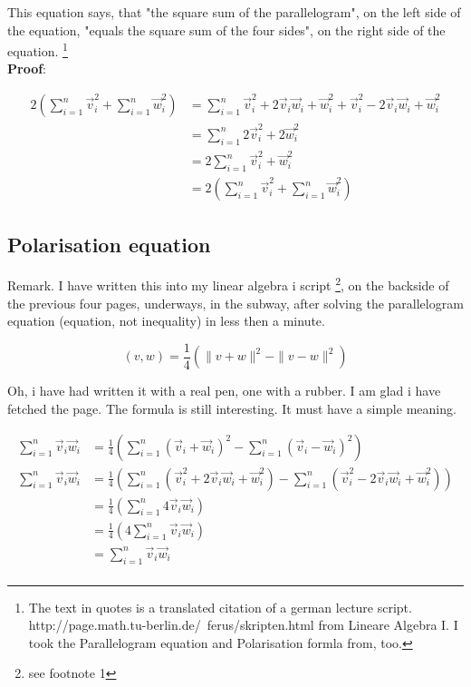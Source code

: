 \documentclass[a4paper]{article}
\begin{document}
This equation says, that "the square sum of the parallelogram", on the left side of the equation, "equals the square sum of the four sides", on the right side of the equation. \footnote{The text in quotes is a translated citation of a german lecture script. http://page.math.tu-berlin.de/~ferus/skripten.html from Lineare Algebra I. I took the Parallelogram equation and Polarisation formla from, too.}\\

\textbf{Proof}:

\begin{displaymath}
\begin{align}
2(\sum_{i=1}^{n}\vec{v}_{i}^{2} + \sum_{i=1}^{n}\vec{w}_{i}^{2}) &= \sum_{i=1}^{n}\vec{v}_{i}^{2}+2\vec{v}_{i}\vec{w}_{i}+\vec{w}_{i}^{2}+\vec{v}_{i}^{2}-2\vec{v}_{i}\vec{w}_{i}+\vec{w}_{i}^{2}\\
&= \sum_{i=1}^{n}2\vec{v}_{i}^{2}+2\vec{w}_{i}^2\\ 
&= 2\sum_{i=1}^{n}\vec{v}_{i}^{2}+\vec{w}_{i}^{2} \\
&= 2(\sum_{i=1}^{n}\vec{v}_{i}^{2} + \sum_{i=1}^{n}\vec{w}_{i}^{2})
\end{align}
\end{displaymath}

\subsection{Polarisation equation}

Remark. I have written this into my linear algebra i script \cite{FerusLA}\footnote{see footnote 1}, on the backside of the previous four pages, underways, 
in the subway, after solving the parallelogram equation (equation, not inequality) in less then a minute. 

\begin{displaymath}
(v,w) = \frac{1}{4}(\|v+w\|^{2}-\|v-w\|^{2})
\end{displaymath}

Oh, i have had written it with a real pen, one with a rubber. I am glad i have fetched the page. The formula is still interesting.
It must have a simple meaning.

\begin{displaymath}
\begin{align}
\sum_{i=1}^{n}\vec{v}_{i}\vec{w}_{i} &= \frac{1}{4}(\sum_{i=1}^{n}(\vec{v}_{i}+\vec{w}_{i})^{2} - \sum_{i=1}^{n}(\vec{v}_{i}-\vec{w}_{i})^{2}) \\
\sum_{i=1}^{n}\vec{v}_{i}\vec{w}_{i} &= \frac{1}{4}(\sum_{i=1}^{n}(\vec{v}_{i}^{2}+2\vec{v}_{i}\vec{w}_{i}+\vec{w}_{i}^{2})-\sum_{i=1}^{n}(\vec{v}_{i}^{2}-2\vec{v}_{i}\vec{w}_{i}+\vec{w}_{i}^{2}))\\
&= \frac{1}{4}(\sum_{i=1}^{n}4\vec{v}_{i}\vec{w}_{i})\\
&= \frac{1}{4}(4\sum_{i=1}^{n}\vec{v}_{i}\vec{w}_{i})\\
&= \sum_{i=1}^{n}\vec{v}_{i}\vec{w}_{i}\\
\end{align}
\end{displaymath}
\end{document}
